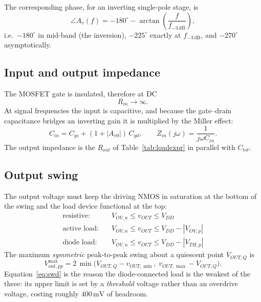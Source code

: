 \documentclass[12pt,a4paper]{article}
\newcommand{\U}[1]{\,\mathrm{#1}}
\newcommand{\dg}{^{\circ}}
\begin{document}
The corresponding phase, for an inverting single-pole stage, is
\begin{equation}
\angle A_v(f) = -180\dg - \arctan\!\left(\frac{f}{f_{-3\U{dB}}}\right),
\label{eq:phase}
\end{equation}
i.e.\ $-180\dg$ in mid-band (the inversion), $-225\dg$ exactly at
$f_{-3\U{dB}}$, and $-270\dg$ asymptotically.

\subsection{Input and output impedance}
The MOSFET gate is insulated, therefore at DC
\begin{equation}
R_{in} \to \infty .
\end{equation}
At signal frequencies the input is capacitive, and because the gate--drain
capacitance bridges an inverting gain it is multiplied by the Miller effect:
\begin{equation}
C_{in} = C_{gs} + (1+|A_{v0}|)\,C_{gd},
\qquad
Z_{in}(j\omega) = \frac{1}{j\omega C_{in}} .
\label{eq:cin}
\end{equation}
The output impedance is the $R_{out}$ of Table~\ref{tab:loadexpr} in parallel
with $C_{tot}$.

\subsection{Output swing}
The output voltage must keep the driving NMOS in saturation at the bottom of
the swing and the load device functional at the top:
\begin{align}
\text{resistive:}\quad & V_{OV,n} \leq v_{OUT} \leq V_{DD} \label{eq:swr}\\
\text{active load:}\quad & V_{OV,n} \leq v_{OUT} \leq V_{DD}-|V_{OV,p}| \label{eq:swa}\\
\text{diode load:}\quad & V_{OV,n} \leq v_{OUT} \leq V_{DD}-|V_{TH,p}| \label{eq:swd}
\end{align}
The maximum \emph{symmetric} peak-to-peak swing about a quiescent point
$V_{OUT,Q}$ is
\begin{equation}
V_{out,pp}^{\max} = 2\,\min\!\big(V_{OUT,Q}-v_{OUT,\min},\;
                                   v_{OUT,\max}-V_{OUT,Q}\big).
\label{eq:swing}
\end{equation}
Equation~\eqref{eq:swd} is the reason the diode-connected load is the weakest
of the three: its upper limit is set by a \emph{threshold} voltage rather than
an overdrive voltage, costing roughly $400\U{mV}$ of headroom.
\end{document}
